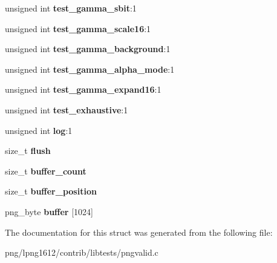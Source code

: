 \begin{DoxyCompactItemize}
\item 
\hypertarget{structpng__modifier_a014acbfad6cd597c981cfa34cc5ea0c8}{unsigned int {\bfseries test\+\_\+gamma\+\_\+sbit}\+:1}\label{structpng__modifier_a014acbfad6cd597c981cfa34cc5ea0c8}

\item 
\hypertarget{structpng__modifier_a8f1841eea0d5975017abfe022b8a698f}{unsigned int {\bfseries test\+\_\+gamma\+\_\+scale16}\+:1}\label{structpng__modifier_a8f1841eea0d5975017abfe022b8a698f}

\item 
\hypertarget{structpng__modifier_a8f43874d761ed2c7367444799885e81c}{unsigned int {\bfseries test\+\_\+gamma\+\_\+background}\+:1}\label{structpng__modifier_a8f43874d761ed2c7367444799885e81c}

\item 
\hypertarget{structpng__modifier_a75d652e24a68655dbececbd8bfaf1ea1}{unsigned int {\bfseries test\+\_\+gamma\+\_\+alpha\+\_\+mode}\+:1}\label{structpng__modifier_a75d652e24a68655dbececbd8bfaf1ea1}

\item 
\hypertarget{structpng__modifier_a31d6d9a196e6840f75d2aa8980a90992}{unsigned int {\bfseries test\+\_\+gamma\+\_\+expand16}\+:1}\label{structpng__modifier_a31d6d9a196e6840f75d2aa8980a90992}

\item 
\hypertarget{structpng__modifier_a311f72c0147132847b9d1d8df252736a}{unsigned int {\bfseries test\+\_\+exhaustive}\+:1}\label{structpng__modifier_a311f72c0147132847b9d1d8df252736a}

\item 
\hypertarget{structpng__modifier_ac5719023a909f61f6fb377d615bc454b}{unsigned int {\bfseries log}\+:1}\label{structpng__modifier_ac5719023a909f61f6fb377d615bc454b}

\item 
\hypertarget{structpng__modifier_a308f199bdf4ae4424039e6f7be62be9d}{size\+\_\+t {\bfseries flush}}\label{structpng__modifier_a308f199bdf4ae4424039e6f7be62be9d}

\item 
\hypertarget{structpng__modifier_a6344e981b263f0f8fbd15e747f2916ce}{size\+\_\+t {\bfseries buffer\+\_\+count}}\label{structpng__modifier_a6344e981b263f0f8fbd15e747f2916ce}

\item 
\hypertarget{structpng__modifier_a180bc9a2bf9422ff8d15c868c1aaae85}{size\+\_\+t {\bfseries buffer\+\_\+position}}\label{structpng__modifier_a180bc9a2bf9422ff8d15c868c1aaae85}

\item 
\hypertarget{structpng__modifier_ac5c54a4b2e52639122a5a660afb43514}{png\+\_\+byte {\bfseries buffer} \mbox{[}1024\mbox{]}}\label{structpng__modifier_ac5c54a4b2e52639122a5a660afb43514}

\end{DoxyCompactItemize}


The documentation for this struct was generated from the following file\+:\begin{DoxyCompactItemize}
\item 
png/lpng1612/contrib/libtests/pngvalid.\+c\end{DoxyCompactItemize}
